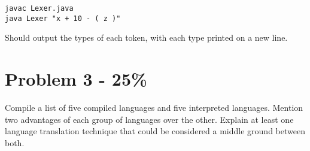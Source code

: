 \documentclass{article}
\begin{document}
\begin{verbatim}
javac Lexer.java
java Lexer "x + 10 - ( z )"
\end{verbatim}
Should output the types of each token, with each type printed on a new line.


\section*{Problem 3 - 25\%}
{ Compile a list of five compiled languages and five interpreted languages. Mention two advantages of each group of languages over the other. Explain at least one language translation technique that could be considered a middle ground between both.}
\end{document}
